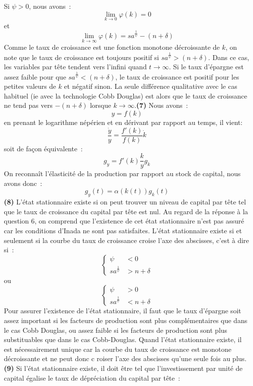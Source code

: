 \documentclass[11pt,a4paper,notitlepage]{article}
\begin{document}
Si $\psi>0$, nous avons :
\[
  \lim_{k\rightarrow 0}\varphi(k) = 0
\]
et
\[
  \lim_{k\rightarrow\infty}\varphi(k) = s a^\frac{1}{\psi}-(n+\delta)
\]
Comme le taux de croissance est une fonction monotone décroissante de $k$, on note que le taux de croissance est toujours positif si $s a^\frac{1}{\psi}>(n+\delta)$. Dans ce cas, les variables par tête tendent vers l'infini quand $t\rightarrow\infty$. Si le taux d'épargne est assez faible pour que $s a^\frac{1}{\psi}<(n+\delta)$, le taux de croissance est positif pour les petites valeurs de $k$ et négatif sinon. La seule différence qualitative  avec le cas habituel (ie avec la technologie Cobb Douglas) est alors que le taux de croissance ne tend pas vers $-(n+\delta)$ lorsque $k\rightarrow\infty$.\newline \textbf{(7)} Nous avons :
\[
y = f(k)
\]
en prenant le logarithme népérien et en dérivant par rapport au temps, il vient:
\[
\frac{\dot y}{y} = \frac{f'(k)}{f(k)} \dot k
\]
soit de façon équivalente :
\[
g_y = f'(k)\frac{k}{y} g_k
\]
On reconnaît l'élasticité de la production par rapport au stock de capital, nous avons donc :
\[
g_y(t) = \alpha(k(t)) g_k(t)
\] 
\textbf{(8)} L'état stationnaire existe si on peut trouver un niveau de capital par tête tel que le taux de croissance du capital par tête est nul. Au regard de la réponse à la question 6, on comprend que l'existence de cet état stationnaire n'est pas assuré car les conditions d'Inada ne sont pas satisfaites. L'état stationnaire existe si et seulement si la courbe du taux de croissance croise l'axe des abscisses, c'est à dire si :
\[
  \begin{cases}
    \psi &< 0 \\
    s a^\frac{1}{\psi} &> n+\delta
  \end{cases}
\]
ou
\[
  \begin{cases}
    \psi &> 0 \\
    s a^\frac{1}{\psi} &< n+\delta
  \end{cases}
\]
Pour assurer l'existence de l'état stationnaire, il faut que le taux d'épargne soit assez important si les facteurs de production sont plus complémentaires que dans le cas Cobb Douglas, ou assez faible si les facteurs de production sont plus substituables que dans le cas Cobb-Douglas. Quand l'état stationnaire existe, il est nécessairement unique car la courbe du taux de croissance est monotone décroissante et ne peut donc c roiser l'axe des abscisses qu'une seule fois au plus. \textbf{(9)} Si l'état stationnaire existe, il doit être tel que l'investissement par unité de capital égalise le taux de dépréciation du capital par tête :
\end{document}
